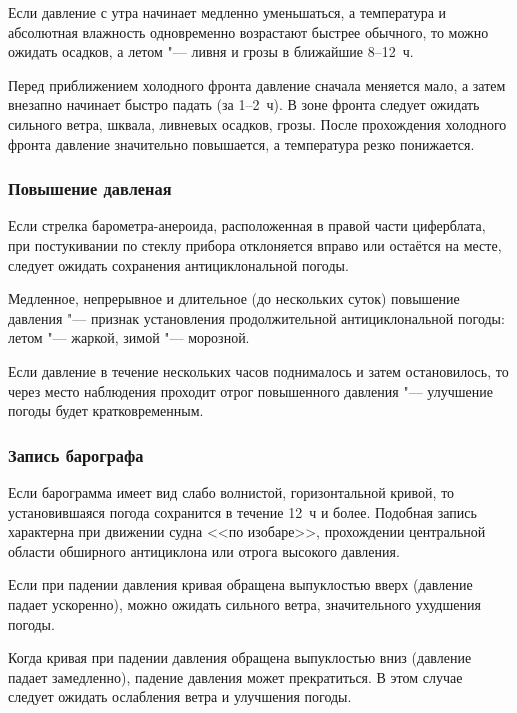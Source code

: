  Если давление с утра начинает медленно уменьшаться, а
температура и абсолютная влажность одновременно возрастают быстрее
обычного, то можно ожидать осадков, а летом "--- ливня и грозы в
ближайшие 8--12~ч.

 Перед приближением холодного фронта давление сначала меняется
мало, а затем внезапно начинает быстро падать (за 1--2~ч). В зоне
фронта следует ожидать сильного ветра, шквала, ливневых осадков,
грозы. После прохождения холодного фронта давление значительно
повышается, а температура резко понижается.

\subsubsection{Повышение давленая}

 Если стрелка барометра-анероида, расположенная в правой части
циферблата, при постукивании по стеклу прибора отклоняется вправо или
остаётся на месте, следует ожидать сохранения антициклональной погоды.

 Медленное, непрерывное и длительное (до нескольких суток)
повышение давления "--- признак установления продолжительной
антициклональной погоды: летом "--- жаркой, зимой "--- морозной.

 Если давление в течение нескольких часов поднималось и затем
остановилось, то через место наблюдения проходит отрог повышенного
давления "--- улучшение погоды будет кратковременным.

\subsubsection{Запись барографа}

 Если барограмма имеет вид слабо волнистой, горизонтальной
кривой, то установившаяся погода сохранится в течение 12~ч и
более. Подобная запись характерна при движении судна <<по изобаре>>,
прохождении центральной области обширного антициклона или отрога
высокого давления.

 Если при падении давления кривая обращена выпуклостью вверх
(давление падает ускоренно), можно ожидать сильного ветра,
значительного ухудшения погоды.

 Когда кривая при падении давления обращена выпуклостью вниз
(давление падает замедленно), падение давления может прекратиться. В
этом случае следует ожидать ослабления ветра и улучшения погоды.

